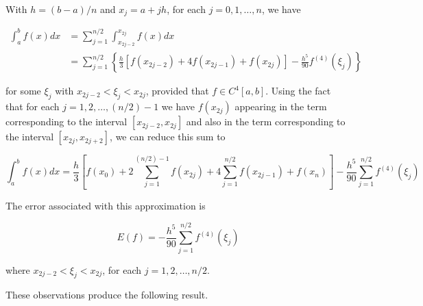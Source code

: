 With $h=(b-a) / n$ and $x_{j}=a+j h$, for each $j=0,1, \ldots, n$, we have

$$
\begin{aligned}
\int_{a}^{b} f(x) d x & =\sum_{j=1}^{n / 2} \int_{x_{2 j-2}}^{x_{2 j}} f(x) d x \\
& =\sum_{j=1}^{n / 2}\left\{\frac{h}{3}\left[f\left(x_{2 j-2}\right)+4 f\left(x_{2 j-1}\right)+f\left(x_{2 j}\right)\right]-\frac{h^{5}}{90} f^{(4)}\left(\xi_{j}\right)\right\}
\end{aligned}
$$

for some $\xi_{j}$ with $x_{2 j-2}<\xi_{j}<x_{2 j}$, provided that $f \in C^{4}[a, b]$. Using the fact that for each $j=1,2, \ldots,(n / 2)-1$ we have $f\left(x_{2 j}\right)$ appearing in the term corresponding to the interval $\left[x_{2 j-2}, x_{2 j}\right]$ and also in the term corresponding to the interval $\left[x_{2 j}, x_{2 j+2}\right]$, we can reduce this sum to

$$
\int_{a}^{b} f(x) d x=\frac{h}{3}\left[f\left(x_{0}\right)+2 \sum_{j=1}^{(n / 2)-1} f\left(x_{2 j}\right)+4 \sum_{j=1}^{n / 2} f\left(x_{2 j-1}\right)+f\left(x_{n}\right)\right]-\frac{h^{5}}{90} \sum_{j=1}^{n / 2} f^{(4)}\left(\xi_{j}\right)
$$

The error associated with this approximation is

$$
E(f)=-\frac{h^{5}}{90} \sum_{j=1}^{n / 2} f^{(4)}\left(\xi_{j}\right)
$$

where $x_{2 j-2}<\xi_{j}<x_{2 j}$, for each $j=1,2, \ldots, n / 2$.

%
%
%
%
%
%
%
%
%
%
%

These observations produce the following result.

